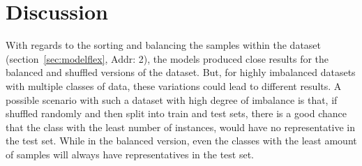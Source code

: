 \section {Discussion}
\label{sec:discussion}

With regards to the sorting and balancing the samples within the dataset 
(section~\ref{sec:modelflex}, Addr: 2), the models produced close results for the balanced and shuffled 
versions of the dataset. But, for highly imbalanced datasets with multiple classes of data, 
these variations could lead to different results. 
A possible scenario with such a dataset with high degree of imbalance is that, if shuffled randomly 
and then split into train and test sets, there is a good chance that the class with the 
least number of instances, would have no representative in the test set. While in the balanced 
version, even the classes with the least amount of samples will always have representatives in the 
test set. 